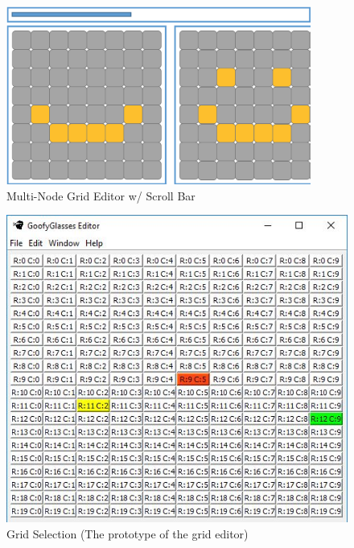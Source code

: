 \documentclass[12pt]{article}
\begin{document}
  	\begin{figure}[ht!]
  		\centering
  		\includegraphics[width=100mm]{Multi-grid.png}
  		\caption{Multi-Node Grid Editor w/ Scroll Bar}
  	\end{figure}    
  
    \begin{figure}[ht!]
      \centering
      \includegraphics[width=150mm]{protoGrid.JPG}
      \caption{Grid Selection (The prototype of the grid editor)}
    \end{figure}
	\clearpage	
	
\end{document}
